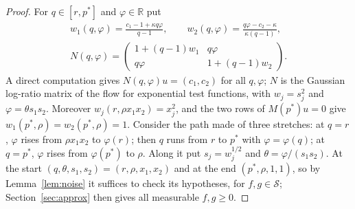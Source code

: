 \documentclass[11pt]{amsart}
\theoremstyle{definition}
\newcommand{\R}{\mathbb{R}}
\newcommand{\cS}{\mathcal{S}}
\begin{document}
\begin{proof}
For $q\in[r,p^*]$ and $\varphi\in\R$ put
\begin{gather*}
w_1(q,\varphi)=\frac{c_1-1+\kappa q\varphi}{q-1},\qquad w_2(q,\varphi)=\frac{q\varphi-c_2-\kappa}{\kappa(q-1)},\\
N(q,\varphi)=\begin{pmatrix}1+(q-1)w_1&q\varphi\\q\varphi&1+(q-1)w_2\end{pmatrix}.
\end{gather*}
A direct computation gives $N(q,\varphi)u=(c_1,c_2)$ for all $q,\varphi$; $N$ is the Gaussian log-ratio matrix of the
flow for exponential test functions, with $w_j=s_j^2$ and $\varphi=\theta s_1s_2$. Moreover $w_j(r,\rho x_1x_2)=x_j^2$,
and the two rows of $M(p^*)u=0$ give $w_1(p^*,\rho)=w_2(p^*,\rho)=1$. Consider the path made of three stretches: at
$q=r$, $\varphi$ rises from $\rho x_1x_2$ to $\varphi(r)$; then $q$ runs from $r$ to $p^*$ with $\varphi=\varphi(q)$; at
$q=p^*$, $\varphi$ rises from $\varphi(p^*)$ to $\rho$. Along it put $s_j=w_j^{1/2}$ and $\theta=\varphi/(s_1s_2)$. At
the start $(q,\theta,s_1,s_2)=(r,\rho,x_1,x_2)$ and at the end $(p^*,\rho,1,1)$, so by Lemma~\ref{lem:noise} it suffices
to check its hypotheses, for $f,g\in\cS$; Section~\ref{sec:approx} then gives all measurable $f,g\ge0$.


\end{proof}
\end{document}
